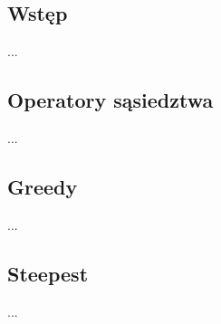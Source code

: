 \subsection{Wstęp}

...

\subsection{Operatory sąsiedztwa}

...

\subsection{Greedy}

...

\subsection{Steepest}

...
